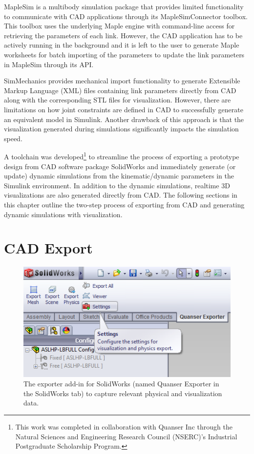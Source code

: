 MapleSim \cite{sw:maplesim} is a multibody simulation package that provides limited functionality to communicate with CAD applications through its MapleSimConnector toolbox. This toolbox uses the underlying Maple engine with command-line access for retrieving the parameters of each link. However, the CAD application has to be actively running in the background and it is left to the user to generate Maple worksheets for batch importing of the parameters to update the link parameters in MapleSim through its API.

SimMechanics \cite{sw:simmech} provides mechanical import functionality to generate Extensible Markup Language (XML) files containing link parameters directly from CAD along with the corresponding STL files for visualization. However, there are limitations on how joint constraints are defined in CAD to successfully generate an equivalent model in Simulink. Another drawback of this approach is that the visualization generated during simulations significantly impacts the simulation speed.

A toolchain was developed\footnote{This work was completed in collaboration with Quanser Inc through the Natural Sciences and Engineering Research Council (NSERC)'s Industrial Postgraduate Scholarship Program.} to streamline the process of exporting a prototype design from CAD software package SolidWorks and immediately generate (or update) dynamic simulations from the kinematic/dynamic parameters in the Simulink environment. In addition to the dynamic simulations, realtime 3D visualizations are also generated directly from CAD. The following sections in this chapter outline the two-step process of exporting from CAD and generating dynamic simulations with visualization. 

\section{CAD Export} %
\label{sec:cad_export}

\begin{figure}[!h]
	\centering
    \includegraphics[scale=1.0]{fig/ch3/exporter.png}
  	\caption{The exporter add-in for SolidWorks (named Quanser Exporter in the SolidWorks tab) to capture relevant physical and visualization data.}
	\label{fig:swexporter}
\end{figure}

